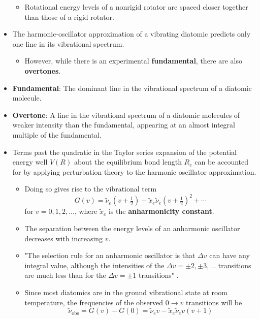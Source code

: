 \documentclass[../notes.tex]{subfiles}
\begin{document}
\begin{itemize}
\begin{itemize}
        \item Rotational energy levels of a nonrigid rotator are spaced closer together than those of a rigid rotator.
    \end{itemize}
    \item The harmonic-oscillator approximation of a vibrating diatomic predicts only one line in its vibrational spectrum.
    \begin{itemize}
        \item However, while there is an experimental \textbf{fundamental}, there are also \textbf{overtones}.
    \end{itemize}
    \item \textbf{Fundamental}: The dominant line in the vibrational spectrum of a diatomic molecule.
    \item \textbf{Overtone}: A line in the vibrational spectrum of a diatomic molecules of weaker intensity than the fundamental, appearing at an almost integral multiple of the fundamental.
    \item Terms past the quadratic in the Taylor series expansion of the potential energy well $V(R)$ about the equilibrium bond length $R_e$ can be accounted for by applying perturbation theory to the harmonic oscillator approximation.
    \begin{itemize}
        \item Doing so gives rise to the vibrational term
        \begin{equation*}
            G(v) = \tilde{\nu}_e(v+\tfrac{1}{2})-\tilde{x}_e\tilde{\nu}_e(v+\tfrac{1}{2})^2+\cdots
        \end{equation*}
        for $v=0,1,2,\dots$, where $\tilde{x}_e$ is the \textbf{anharmonicity constant}.
        \item The separation between the energy levels of an anharmonic oscillator decreases with increasing $v$.
        \item "The selection rule for an anharmonic oscillator is that $\Delta v$ can have any integral value, although the intensities of the $\Delta v=\pm 2,\pm 3,\dots$ transitions are much less than for the $\Delta v=\pm 1$ transitions" \parencite[506]{bib:McQuarrieSimon}.
        \item Since most diatomics are in the ground vibrational state at room temperature, the frequencies of the observed $0\to v$ transitions will be
        \begin{equation*}
            \tilde{\nu}_\text{obs} = G(v)-G(0) = \tilde{\nu}_ev-\tilde{x}_e\tilde{\nu}_ev(v+1)

\end{equation*}
\end{itemize}
\end{itemize}
\end{document}
